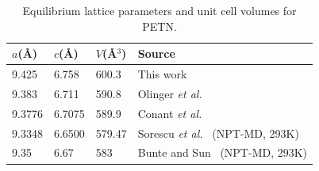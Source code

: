 \documentclass[prb,aps,nobibnotes,twocolumn,doublespace,twocolumngrid,superbib]{revtex4}
\begin{document}
 


\begin{table}[p]
\begin{center}
\begin{tabular}{llll}
\hline\hline
$a$(\AA) & $c$(\AA) & $V$(\AA$^3$) & Source \\
\hline
9.425  & 6.758  &  600.3  & This work \\
9.383  & 6.711  &  590.8  & Olinger {\it et al.}~\cite{Olinger_1975v62}\\
9.3776 & 6.7075 &  589.9  & Conant {\it et al.}~\cite{Conant_1979} \\
9.3348 & 6.6500 &  579.47 & Sorescu {\it et al.}~\cite{Sorescu_1999v103} (NPT-MD, 293K) \\
9.35   & 6.67   &  583    & Bunte and Sun~\cite{Bunte_2000v104} (NPT-MD, 293K) \\
\hline\hline
\end{tabular}
\end{center}
\caption{Equilibrium lattice parameters and unit cell volumes for PETN.
}
\label{tab:table1}
\end{table}
\end{document}
